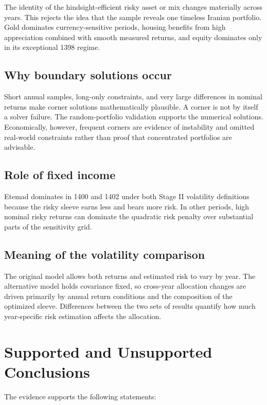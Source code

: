 \documentclass[11pt,a4paper]{article}
\begin{document}
The identity of the hindsight-efficient risky asset or mix changes materially across years.
This rejects the idea that the sample reveals one timeless Iranian portfolio. Gold dominates
currency-sensitive periods, housing benefits from high appreciation combined with smooth measured
returns, and equity dominates only in its exceptional 1398 regime.

\subsection{Why boundary solutions occur}

Short annual samples, long-only constraints, and very large differences in nominal returns make
corner solutions mathematically plausible. A corner is not by itself a solver failure. The
random-portfolio validation supports the numerical solutions. Economically, however, frequent
corners are evidence of instability and omitted real-world constraints rather than proof that
concentrated portfolios are advisable.

\subsection{Role of fixed income}

Etemad dominates in 1400 and 1402 under both Stage II volatility definitions because the risky
sleeve earns less and bears more risk. In other periods, high nominal risky returns can dominate
the quadratic risk penalty over substantial parts of the sensitivity grid.

\subsection{Meaning of the volatility comparison}

The original model allows both returns and estimated risk to vary by year. The alternative model
holds covariance fixed, so cross-year allocation changes are driven primarily by annual return
conditions and the composition of the optimized sleeve. Differences between the two sets of
results quantify how much year-specific risk estimation affects the allocation.

\section{Supported and Unsupported Conclusions}

The evidence supports the following statements:
\end{document}
